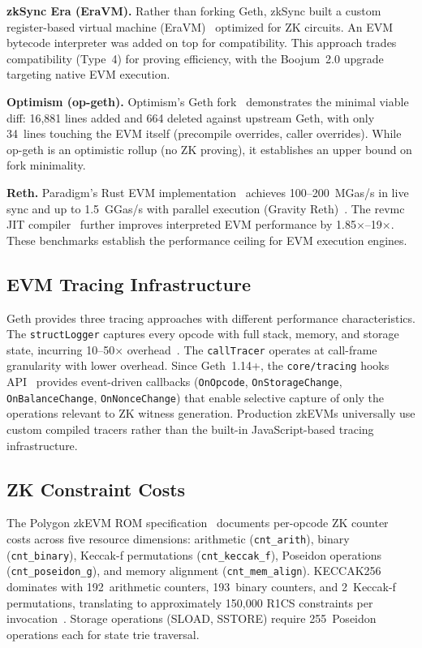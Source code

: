 \textbf{zkSync Era (EraVM).} Rather than forking Geth, zkSync built a custom
register-based virtual machine (EraVM)~\cite{zksync2024architecture} optimized
for ZK circuits. An EVM bytecode interpreter was added on top for compatibility.
This approach trades compatibility (Type~4) for proving efficiency, with the
Boojum~2.0 upgrade targeting native EVM execution.

\textbf{Optimism (op-geth).} Optimism's Geth fork~\cite{optimism2024opgeth}
demonstrates the minimal viable diff: 16{,}881 lines added and 664 deleted
against upstream Geth, with only 34~lines touching the EVM itself (precompile
overrides, caller overrides). While op-geth is an optimistic rollup (no ZK
proving), it establishes an upper bound on fork minimality.

\textbf{Reth.} Paradigm's Rust EVM implementation~\cite{paradigm2024reth}
achieves 100--200~MGas/s in live sync and up to 1.5~GGas/s with parallel
execution (Gravity Reth)~\cite{galxe2025gravity}. The revmc JIT
compiler~\cite{paradigm2024revmc} further improves interpreted EVM performance
by 1.85$\times$--19$\times$. These benchmarks establish the performance ceiling
for EVM execution engines.

\subsection{EVM Tracing Infrastructure}

Geth provides three tracing approaches with different performance
characteristics. The \texttt{structLogger} captures every opcode with full
stack, memory, and storage state, incurring 10--50$\times$
overhead~\cite{geth2024tracing}. The \texttt{callTracer} operates at call-frame
granularity with lower overhead. Since Geth~1.14+, the
\texttt{core/tracing} hooks API~\cite{geth2024hooks} provides event-driven
callbacks (\texttt{OnOpcode}, \texttt{OnStorageChange},
\texttt{OnBalanceChange}, \texttt{OnNonceChange}) that enable selective
capture of only the operations relevant to ZK witness generation. Production
zkEVMs universally use custom compiled tracers rather than the built-in
JavaScript-based tracing infrastructure.

\subsection{ZK Constraint Costs}

The Polygon zkEVM ROM specification~\cite{polygon2024zkcounters} documents
per-opcode ZK counter costs across five resource dimensions: arithmetic
(\texttt{cnt\_arith}), binary (\texttt{cnt\_binary}), Keccak-f permutations
(\texttt{cnt\_keccak\_f}), Poseidon operations (\texttt{cnt\_poseidon\_g}),
and memory alignment (\texttt{cnt\_mem\_align}). KECCAK256 dominates with
192~arithmetic counters, 193~binary counters, and 2~Keccak-f permutations,
translating to approximately 150{,}000 R1CS constraints per
invocation~\cite{burchardt2025constraint}. Storage operations (SLOAD, SSTORE)
require 255~Poseidon operations each for state trie traversal.
